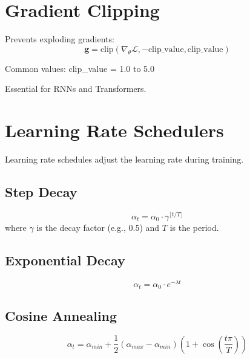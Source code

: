 \section{Gradient Clipping}

Prevents exploding gradients:
\begin{equation}
\mathbf{g} = \text{clip}(\nabla_\theta \mathcal{L}, -\text{clip\_value}, \text{clip\_value})
\end{equation}

Common values: clip\_value = 1.0 to 5.0

Essential for RNNs and Transformers.

\section{Learning Rate Schedulers}

Learning rate schedules adjust the learning rate during training.

\subsection{Step Decay}

\begin{equation}
\alpha_t = \alpha_0 \cdot \gamma^{\lfloor t / T \rfloor}
\end{equation}
where $\gamma$ is the decay factor (e.g., 0.5) and $T$ is the period.

\subsection{Exponential Decay}

\begin{equation}
\alpha_t = \alpha_0 \cdot e^{-\lambda t}
\end{equation}

\subsection{Cosine Annealing}

\begin{equation}
\alpha_t = \alpha_{min} + \frac{1}{2}(\alpha_{max} - \alpha_{min})\left(1 + \cos\left(\frac{t\pi}{T}\right)\right)
\end{equation}

